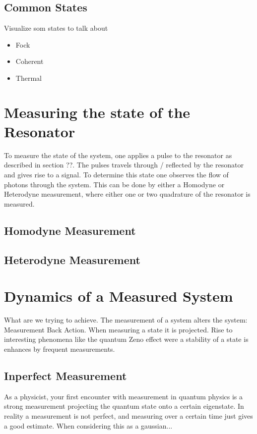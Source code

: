 \subsection{Common States}

\begin{margin}

Visualize som states to talk about

\begin{itemize}
    \item Fock
    \item Coherent
    \item Thermal
\end{itemize}


\section{Measuring the state of the Resonator}
To measure the state of the system, one applies a pulse to the resonator as described in section ??. The pulses travels through / reflected by the resonator and gives rise to a signal. To determine this state one observes the flow of photons through the system. This can be done by either a Homodyne or Heterodyne measurement, where either one or two quadrature of the resonator is measured. 

\subsection{Homodyne Measurement}


\subsection{Heterodyne Measurement}

\section{Dynamics of a Measured System}
What are we trying to achieve. The measurement of a system alters the system: Measurement Back Action. When measuring a state it is projected. Rise to interesting phenomena like the quantum Zeno effect were a stability of a state is enhances by frequent measurements. 

\subsection{Inperfect Measurement}
As a physicist, your first encounter with measurement in quantum physics is a strong measurement projecting the quantum state onto a certain eigenstate. In reality a measurement is not perfect, and measuring over a certain time just gives a good estimate. When considering this as a gaussian... 


\end{margin}
